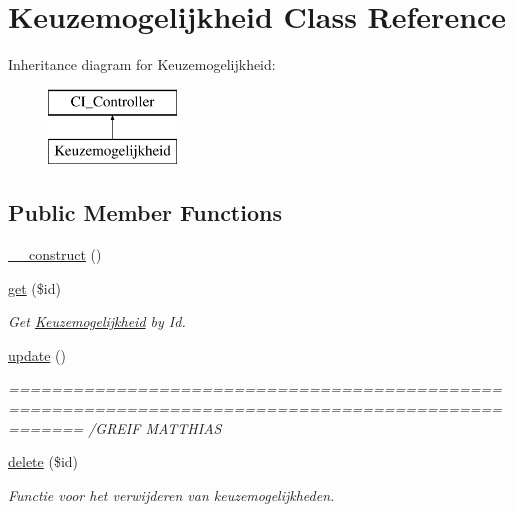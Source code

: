 \hypertarget{class_keuzemogelijkheid}{}\section{Keuzemogelijkheid Class Reference}
\label{class_keuzemogelijkheid}
Inheritance diagram for Keuzemogelijkheid\+:\begin{figure}[H]
\begin{center}
\leavevmode
\includegraphics[height=2.000000cm]{class_keuzemogelijkheid}
\end{center}
\end{figure}
\subsection*{Public Member Functions}
\begin{DoxyCompactItemize}
\item 
\mbox{\hyperlink{class_keuzemogelijkheid_a095c5d389db211932136b53f25f39685}{\+\_\+\+\_\+construct}} ()
\item 
\mbox{\hyperlink{class_keuzemogelijkheid_a50e3bfb586b2f42932a6a93f3fbb0828}{get}} (\$id)
\begin{DoxyCompactList}\small\item\em Get \mbox{\hyperlink{class_keuzemogelijkheid}{Keuzemogelijkheid}} by Id. \end{DoxyCompactList}\item 
\mbox{\hyperlink{class_keuzemogelijkheid_a842e4774e3b3601a005b995c02f7e883}{update}} ()
\begin{DoxyCompactList}\small\item\em =================================================================================================== /\+G\+R\+E\+IF M\+A\+T\+T\+H\+I\+AS \end{DoxyCompactList}\item 
\mbox{\hyperlink{class_keuzemogelijkheid_a2f8258add505482d7f00ea26493a5723}{delete}} (\$id)
\begin{DoxyCompactList}\small\item\em Functie voor het verwijderen van keuzemogelijkheden. \end{DoxyCompactList}\end{DoxyCompactItemize}


